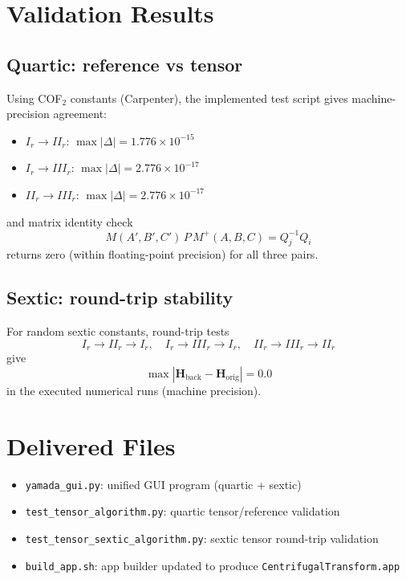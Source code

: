 \documentclass[11pt]{article}
\begin{document}
\section*{Validation Results}
\subsection*{Quartic: reference vs tensor}
Using COF$_2$ constants (Carpenter), the implemented test script gives machine-precision agreement:
\begin{itemize}
\item $I_r\to II_r$: $\max|\Delta| = 1.776\times 10^{-15}$
\item $I_r\to III_r$: $\max|\Delta| = 2.776\times 10^{-17}$
\item $II_r\to III_r$: $\max|\Delta| = 2.776\times 10^{-17}$
\end{itemize}
and matrix identity check
\[
M(A',B',C')\,P\,M^+(A,B,C)=Q_j^{-1}Q_i
\]
returns zero (within floating-point precision) for all three pairs.

\subsection*{Sextic: round-trip stability}
For random sextic constants, round-trip tests
\[
I_r\to II_r\to I_r,
\quad
I_r\to III_r\to I_r,
\quad
II_r\to III_r\to II_r
\]
give
\[
\max\left|\mathbf H_{\mathrm{back}}-\mathbf H_{\mathrm{orig}}\right|=0.0
\]
in the executed numerical runs (machine precision).

\section*{Delivered Files}
\begin{itemize}
\item \texttt{yamada\_gui.py}: unified GUI program (quartic + sextic)
\item \texttt{test\_tensor\_algorithm.py}: quartic tensor/reference validation
\item \texttt{test\_tensor\_sextic\_algorithm.py}: sextic tensor round-trip validation
\item \texttt{build\_app.sh}: app builder updated to produce \texttt{CentrifugalTransform.app}
\end{itemize}
\end{document}
